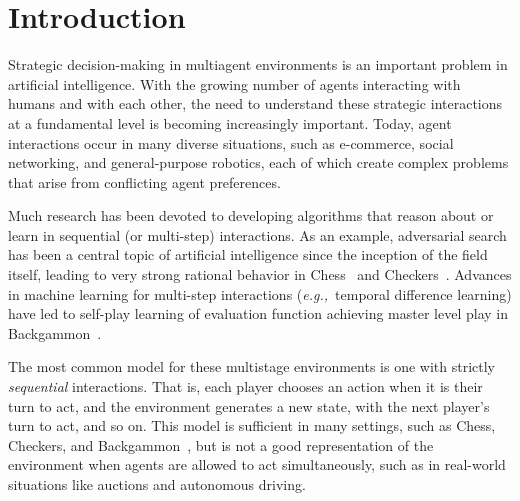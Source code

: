 \documentclass[preprint,12pt]{elsarticle}
\newcommand{\eg}{{\it e.g.,}~}
\begin{document}




\section{Introduction}
\label{sec:intro}

Strategic decision-making in multiagent environments is an important problem in artificial intelligence. 
With the growing number of agents interacting with humans and with each other, the need to 
understand these strategic interactions at a fundamental level is becoming increasingly important. 
Today, agent interactions occur in many diverse situations, such as e-commerce, social networking, and 
general-purpose robotics, each of which create complex problems that arise from conflicting agent 
preferences. 

Much research has been devoted to developing algorithms that reason about or learn in sequential (or multi-step) 
interactions. As an example, adversarial search has been a central topic of artificial intelligence 
since the inception of the field itself, leading to very strong rational behavior in 
Chess~\cite{Campbell02deepblue} and Checkers~\cite{Schaeffer96chinook}. Advances in machine learning for multi-step interactions 
(\eg temporal difference learning) have led to self-play learning of evaluation function achieving master level play 
in Backgammon~\cite{Tesauro95TDGammon}. 

The most common model for these multistage environments is one with strictly {\it sequential} 
interactions. That is, each player chooses an action when it is their turn to act, and the environment 
generates a new state, with the next player's turn to act, and so on. This model is sufficient in many 
settings, such as Chess, Checkers, and Backgammon~\cite{AIbook}, but is not a good representation of the 
environment when agents are allowed to act simultaneously, such as in real-world situations like auctions and 
autonomous driving. 
\end{document}
